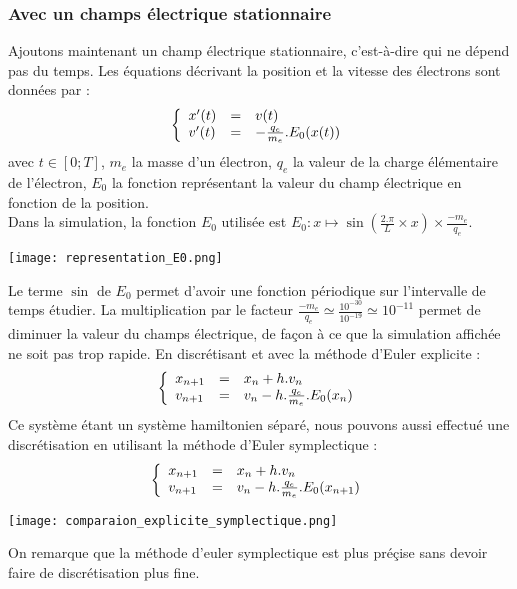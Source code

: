\documentclass{article}
\begin{document}
\subsubsection{Avec un champs électrique stationnaire}
Ajoutons maintenant un champ électrique stationnaire, c'est-à-dire qui ne dépend pas du temps. Les équations décrivant la position et la vitesse des électrons sont données par :
$$
\left \{
   \begin{array}{l l l}
      x'(t)  & = & v(t) \\
      v'(t)  & = & -\frac{q_e}{m_e}.E_0(x(t)) \\
	\end{array}
\right.
$$
avec $t \in [0;T]$, $m_e$ la masse d'un électron, $q_e$ la valeur de la charge élémentaire de l'électron, $E_0$ la fonction représentant la valeur du champ électrique en fonction de la position.\\
Dans la simulation, la fonction $E_0$ utilisée est $E_0 : x \mapsto \sin(\frac{2 . \pi}{L} \times x) \times \frac{-m_e}{q_e}$.\\
\begin{center}
\texttt{[image: representation\_E0.png]}
\end{center}
Le terme $\sin$ de $E_0$ permet d'avoir une fonction périodique sur l'intervalle de temps étudier. La multiplication par le facteur $\frac{-m_e}{q_e} \simeq \frac{10^{-30}}{10^{-19}} \simeq 10^{-11}$ permet de diminuer la valeur du champs électrique, de façon  à ce que la simulation affichée ne soit pas trop rapide.
En discrétisant et avec la méthode d'Euler explicite :
$$
\left \{
   \begin{array}{l l l}
      x_{n+1}  & = & x_n + h.v_n \\
      v_{n+1}  & = & v_n - h.\frac{q_e}{m_e}.E_0(x_n) \\
	\end{array}
\right.
$$
Ce système étant un système hamiltonien séparé, nous pouvons aussi effectué une discrétisation en utilisant la méthode d'Euler symplectique :
$$
\left \{
   \begin{array}{l l l}
      x_{n+1}  & = & x_n + h.v_n \\
      v_{n+1}  & = & v_n - h.\frac{q_e}{m_e}.E_0(x_{n+1}) \\
	\end{array}
\right.
$$
\begin{center}
\texttt{[image: comparaion\_explicite\_symplectique.png]}
\end{center}
On remarque que la méthode d'euler symplectique est plus préçise sans devoir faire de discrétisation plus fine.
\end{document}
